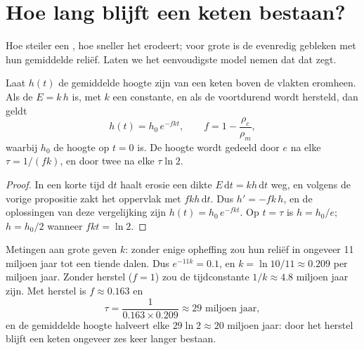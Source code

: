 \section{Hoe lang blijft een keten bestaan?}

Hoe steiler een , hoe sneller het erodeert; voor grote  is de
 evenredig gebleken met hun gemiddelde reliëf. Laten we het
eenvoudigste model nemen dat dat zegt.

\begin{proposition}\label{prop:g12:destruction-of-mountains:decay}
Laat $h(t)$ de gemiddelde hoogte zijn van een keten boven de vlakten eromheen. Als
de  $E = k\,h$ is, met $k$ een constante, en als de 
voortdurend wordt hersteld, dan geldt
\[
  h(t) = h_0\, e^{-f k t}, \qquad f = 1 - \frac{\rho_c}{\rho_m},
\]
waarbij $h_0$ de hoogte op $t = 0$ is. De hoogte wordt gedeeld door $e$
na elke $\tau = 1/(fk)$, en door twee na elke $\tau \ln 2$.
\end{proposition}

\begin{proof}
In een korte tijd $\mathrm{d}t$ haalt erosie een dikte $E\,\mathrm{d}t
= k h\,\mathrm{d}t$ weg, en volgens de vorige propositie zakt het oppervlak
met $f k h\,\mathrm{d}t$. Dus $h' = -fk\,h$, en de oplossingen van deze
vergelijking zijn $h(t) = h_0\,e^{-fkt}$. Op $t = \tau$ is $h = h_0/e$; $h = h_0/2$
wanneer $fkt = \ln 2$.
\end{proof}

Metingen aan grote  geven $k$: zonder enige opheffing zou hun reliëf
in ongeveer 11 miljoen jaar tot een tiende dalen. Dus $e^{-11k} = 0.1$, en $k =
\ln 10/11 \approx 0.209$ per miljoen jaar. Zonder herstel ($f = 1$) zou de
tijdconstante $1/k \approx 4.8$ miljoen jaar zijn. Met herstel is $f
\approx 0.163$ en
\[
  \tau = \frac{1}{0.163 \times 0.209} \approx 29 \text{ miljoen jaar},
\]
en de gemiddelde hoogte halveert elke $29 \ln 2 \approx 20$ miljoen jaar:
door het herstel blijft een keten ongeveer zes keer langer bestaan.

